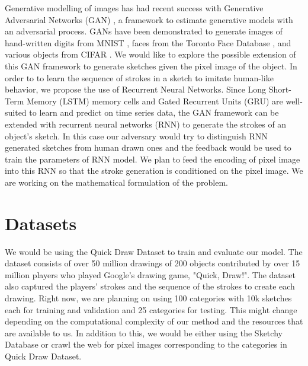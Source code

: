 \documentclass{article}
\begin{document}
Generative modelling of images has had recent success with  Generative Adversarial Networks (GAN) \cite{GAN}, a framework to estimate generative models with an adversarial process. GANs have been demonstrated to generate images of hand-written digits from MNIST \cite{MNIST}, faces from the Toronto Face Database \cite{TFD}, and various objects from CIFAR \cite{CIFAR}. We would like to explore the possible extension of this GAN framework to generate sketches given the pixel image of the object. In order to to learn the sequence of strokes in a sketch to imitate human-like behavior, we propose the use of Recurrent Neural Networks. Since Long Short-Term Memory (LSTM) \cite{LSTM} memory cells and Gated Recurrent Units (GRU) \cite{GRU} are well-suited to learn and predict on time series data, the GAN framework can be extended with recurrent neural networks (RNN) to generate the strokes of an object's sketch. In this case our adversary would try to distinguish RNN generated sketches from human drawn ones and the feedback would be used to train the parameters of RNN model. We plan to feed the encoding of pixel image into this RNN so that the stroke generation is conditioned on the pixel image.  We are working on the mathematical formulation of the problem.

\section{Datasets}
We would be using the Quick Draw Dataset \cite{quickdraw} to train and evaluate our model. The dataset consists of over 50 million drawings of 200 objects contributed by over 15 million players who played Google’s drawing game, "Quick, Draw!". The dataset also captured the players' strokes and the sequence of the strokes to create each drawing. Right now, we are planning on using 100 categories with 10k sketches each for training and validation and 25 categories for testing. This might change depending on the computational complexity of our method and the resources that are available to us. In addition to this, we would be either using the Sketchy Database \cite{sketchydb} or crawl the web for pixel images corresponding to the categories in Quick Draw Dataset.

{\small


}
\end{document}
